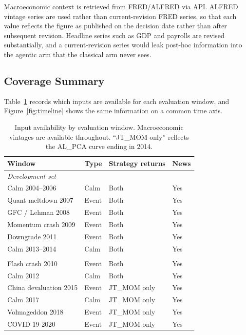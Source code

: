 \documentclass[11pt,a4paper]{article}
\begin{document}
  Macroeconomic context is retrieved from FRED/ALFRED via API. ALFRED vintage
  series are used rather than current-revision FRED series, so that each value
  reflects the figure as published on the decision date rather than after
  subsequent revision. Headline series such as GDP and payrolls are revised
  substantially, and a current-revision series would leak post-hoc information
  into the agentic arm that the classical arm never sees.

  \subsection{Coverage Summary}\label{sec:data-coverage}

  Table~\ref{tab:coverage} records which inputs are available for each evaluation
  window, and Figure~\ref{fig:timeline} shows the same information on a common
  time axis.

  \begin{table}[htbp]
  \centering
  \small
  \caption{Input availability by evaluation window. Macroeconomic vintages are
  available throughout. ``JT\_MOM only'' reflects the AL\_PCA curve ending in
  2014.}
  \label{tab:coverage}
  \begin{tabular}{llll}
  \toprule
  Window & Type & Strategy returns & News \\
  \midrule
  \multicolumn{4}{l}{\emph{Development set}} \\
  Calm 2004--2006      & Calm  & Both        & Yes \\
  Quant meltdown 2007  & Event & Both        & Yes \\
  GFC / Lehman 2008    & Event & Both        & Yes \\
  Momentum crash 2009  & Event & Both        & Yes \\
  Downgrade 2011       & Event & Both        & Yes \\
  Calm 2013--2014      & Calm  & Both        & Yes \\
  \addlinespace
  \multicolumn{4}{l}{\emph{Test set}} \\
  Flash crash 2010     & Event & Both        & Yes \\
  Calm 2012            & Calm  & Both        & Yes \\
  China devaluation 2015 & Event & JT\_MOM only & Yes \\
  Calm 2017            & Calm  & JT\_MOM only & Yes \\
  Volmageddon 2018     & Event & JT\_MOM only & Yes \\
  COVID-19 2020        & Event & JT\_MOM only & Yes \\
  \bottomrule
  \end{tabular}
  \end{table}
\end{document}
